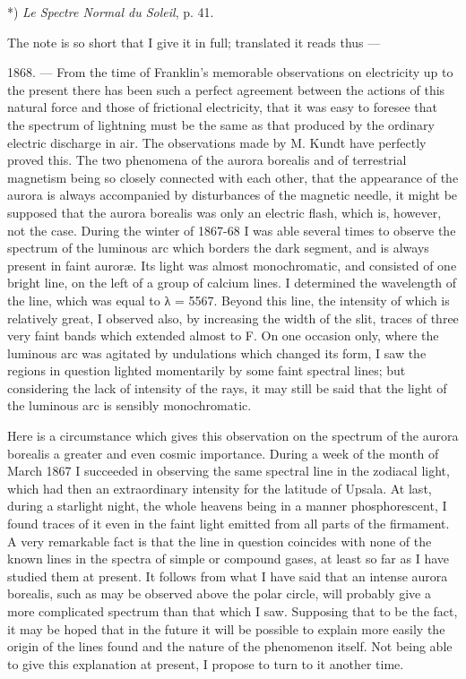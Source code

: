 \documentclass[a4paper, 12pt, oneside, polutonikogreek, english]{article}
\begin{document}
*) \emph{Le Spectre Normal du Soleil}, p. 41.

The note is so short that I give it in full; translated it reads thus ---

1868. --- From the time of Franklin's memorable observations on electricity up to the present there has been such a perfect agreement between the actions of this natural force and those of frictional electricity, that it was easy to foresee that the spectrum of lightning must be the same as that produced by the ordinary electric discharge in air. The observations made by M. Kundt have perfectly proved this. The two phenomena of the aurora borealis and of terrestrial magnetism being so closely connected with each other, that the appearance of the aurora is always accompanied by disturbances of the magnetic needle, it might be supposed that the aurora borealis was only an electric flash, which is, however, not the case. During the winter of 1867-68 I was able several times to observe the spectrum of the luminous arc which borders the dark segment, and is always present in faint auroræ. Its light was almost monochromatic, and consisted of one bright line, on the left of a group of calcium lines. I determined the wavelength of the line, which was equal to λ = 5567. Beyond this line, the intensity of which is relatively great, I observed also, by increasing the width of the slit, traces of three very faint bands which extended almost to F. On one occasion only, where the luminous arc was agitated by undulations which changed its form, I saw the regions in question lighted momentarily by some faint spectral lines; but considering the lack of intensity of the rays, it may still be said that the light of the luminous arc is sensibly monochromatic.

Here is a circumstance which gives this observation on the spectrum of the aurora borealis a greater and even cosmic importance. During a week of the month of March 1867 I succeeded in observing the same spectral line in the zodiacal light, which had then an extraordinary intensity for the latitude of Upsala. At last, during a starlight night, the whole heavens being in a manner phosphorescent, I found traces of it even in the faint light emitted from all parts of the firmament. A very remarkable fact is that the line in question coincides with none of the known lines in the spectra of simple or compound gases, at least so far as I have studied them at present. It follows from what I have said that an intense aurora borealis, such as may be observed above the polar circle, will probably give a more complicated spectrum than that which I saw. Supposing that to be the fact, it may be hoped that in the future it will be possible to explain more easily the origin of the lines found and the nature of the phenomenon itself. Not being able to give this explanation at present, I propose to turn to it another time.
\end{document}
